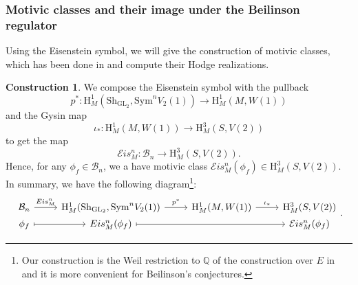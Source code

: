 \documentclass[11pt, a4paper]{amsart}
\theoremstyle{plain}
\theoremstyle{definition}
\newtheorem{construction}[theorem]{Construction}
\numberwithin{equation}{section}
\def\QQ{\mathbb{Q}}
\DeclareMathOperator{\GL}{\mathrm{GL}}
\newcommand{\Sh}{\mathrm{Sh}}
\begin{document}
\subsubsection{Motivic classes and their image under the Beilinson regulator}
\label{SSS: motivic classes and Hodge}
Using the Eisenstein symbol, we will give the construction of  motivic classes, which has been done in \cite[Definition 9.2.3]{LSZ22} and compute 
their Hodge realizations. 

\begin{construction}
\label{Construction: motivic classes}
    We compose the Eisenstein symbol with the pullback 
    \begin{equation*}
    p^{*} \colon \mathrm{H}^{1}_{M}(\Sh_{\GL_2},\mathrm{Sym}^{n} V_2(1)) \rightarrow \mathrm{H}^{1}_{M}(M, W(1))
    \end{equation*}
    and the Gysin map 
    \begin{equation*}
        \iota_{*} \colon \mathrm{H}^{1}_{M}(M, W(1)) \rightarrow \mathrm{H}^{3}_{M}(S, V(2))
    \end{equation*}
    to get the map 
    \begin{equation*}
        \mathcal{E}is^{n}_{M} \colon \mathcal{B}_{n} \rightarrow \mathrm{H}^{3}_{M}(S, V(2)). 
    \end{equation*}
    Hence, for any $\phi_{f} \in \mathcal{B}_{n}$, we a have motivic class $\mathcal{E}is_{M}^{n}(\phi_f) \in \mathrm{H}^{3}_{M}(S, V(2))$. In summary, we have the following diagram\footnote{Our construction is the Weil restriction to $\QQ$ of the construction over $E$ in \cite[Definition 9.2.3.]{LSZ22} and it is more convenient for Beilinson's conjectures.}: 
    \[
        \begin{tikzcd}[row sep=0pt]
            \mathcal{B}_n \ar[r, "Eis^n_M"] & \mathrm{H}^{1}_{M}(\Sh_{\GL_2}, \mathrm{Sym}^{n}V_2(1)) \ar[r, "p^{*}"] & \mathrm{H}^{1}_{M}(M, W(1)) \ar[r, "\iota_{*}"] & \mathrm{H}^{3}_{M}(S,V(2)) \\
            \phi_f \ar[r, mapsto] & Eis^n_M(\phi_f) \ar[rr, mapsto] & & \mathcal{E}is^{n}_{M}(\phi_f) 
        \end{tikzcd}. 
    \]    
\end{construction}
\end{document}
